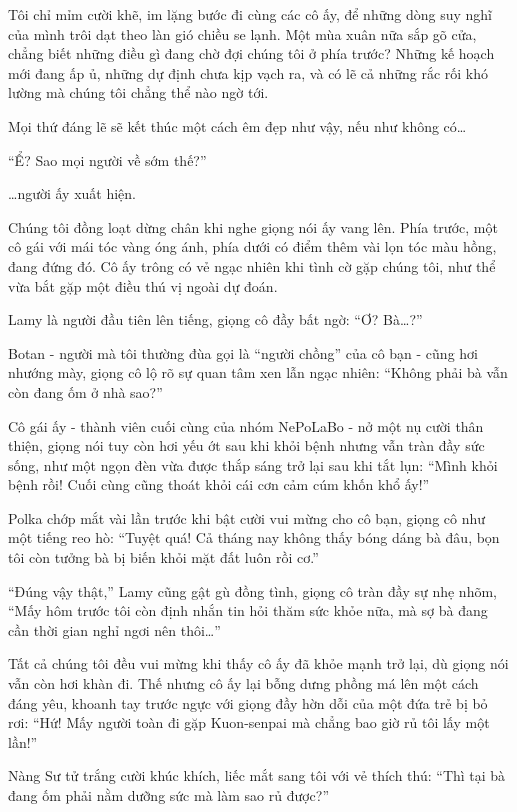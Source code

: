\documentclass[../main.tex]{subfiles}
\begin{document}
Tôi chỉ mỉm cười khẽ, im lặng bước đi cùng các cô ấy, để những dòng suy nghĩ của mình trôi dạt theo làn gió chiều se lạnh. Một mùa xuân nữa sắp gõ cửa, chẳng biết những điều gì đang chờ đợi chúng tôi ở phía trước? Những kế hoạch mới đang ấp ủ, những dự định chưa kịp vạch ra, và có lẽ cả những rắc rối khó lường mà chúng tôi chẳng thể nào ngờ tới.

Mọi thứ đáng lẽ sẽ kết thúc một cách êm đẹp như vậy, nếu như không có\dots

``Ể? Sao mọi người về sớm thế?''

\dots người ấy xuất hiện.

Chúng tôi đồng loạt dừng chân khi nghe giọng nói ấy vang lên. Phía trước, một cô gái với mái tóc vàng óng ánh, phía dưới có điểm thêm vài lọn tóc màu hồng, đang đứng đó. Cô ấy trông có vẻ ngạc nhiên khi tình cờ gặp chúng tôi, như thể vừa bắt gặp một điều thú vị ngoài dự đoán.

Lamy là người đầu tiên lên tiếng, giọng cô đầy bất ngờ: ``Ơ? Bà\dots?''

Botan - người mà tôi thường đùa gọi là ``người chồng'' của cô bạn - cũng hơi nhướng mày, giọng cô lộ rõ sự quan tâm xen lẫn ngạc nhiên: ``Không phải bà vẫn còn đang ốm ở nhà sao?''

Cô gái ấy - thành viên cuối cùng của nhóm NePoLaBo - nở một nụ cười thân thiện, giọng nói tuy còn hơi yếu ớt sau khi khỏi bệnh nhưng vẫn tràn đầy sức sống, như một ngọn đèn vừa được thắp sáng trở lại sau khi tắt lụn: ``Mình khỏi bệnh rồi! Cuối cùng cũng thoát khỏi cái cơn cảm cúm khốn khổ ấy!''

Polka chớp mắt vài lần trước khi bật cười vui mừng cho cô bạn, giọng cô như một tiếng reo hò: ``Tuyệt quá! Cả tháng nay không thấy bóng dáng bà đâu, bọn tôi còn tưởng bà bị biến khỏi mặt đất luôn rồi cơ.''

``Đúng vậy thật,'' Lamy cũng gật gù đồng tình, giọng cô tràn đầy sự nhẹ nhõm, ``Mấy hôm trước tôi còn định nhắn tin hỏi thăm sức khỏe nữa, mà sợ bà đang cần thời gian nghỉ ngơi nên thôi\dots''

Tất cả chúng tôi đều vui mừng khi thấy cô ấy đã khỏe mạnh trở lại, dù giọng nói vẫn còn hơi khàn đi. Thế nhưng cô ấy lại bỗng dưng phồng má lên một cách đáng yêu, khoanh tay trước ngực với giọng đầy hờn dỗi của một đứa trẻ bị bỏ rơi: ``Hứ! Mấy người toàn đi gặp Kuon-senpai mà chẳng bao giờ rủ tôi lấy một lần!''

Nàng Sư tử trắng cười khúc khích, liếc mắt sang tôi với vẻ thích thú: ``Thì tại bà đang ốm phải nằm dưỡng sức mà làm sao rủ được?''
\end{document}

